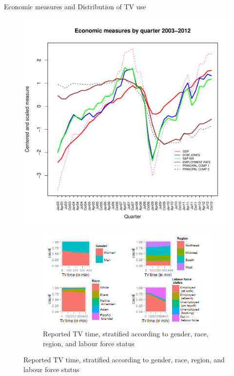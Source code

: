 \documentclass[final]{beamer}
\newcounter{acolumn}%
\begin{document}
\begin{frame}
\begin{acolumns}[t]
\begin{column}{.48\linewidth}
\begin{block}{Economic measures and Distribution of TV use}
\begin{figure}
                 \begin{minipage}{0.5\textwidth}
                 \centering
                 \includegraphics[width=.75\textwidth]{econ_measures.pdf}
                 \end{minipage}%
                 \begin{minipage}{0.5\textwidth}
                 \centering
                 \begin{figure}
                 \includegraphics[height=0.25\textheight,width=\textwidth]{stratification}
                 \caption{Reported TV time, stratified according to gender, race, region, and labour force status}
                 \end{figure}
                 \end{minipage}%
                 \end{figure}
                                 

\end{block}
\end{column}
\end{acolumns}
\end{frame}
\end{document}
